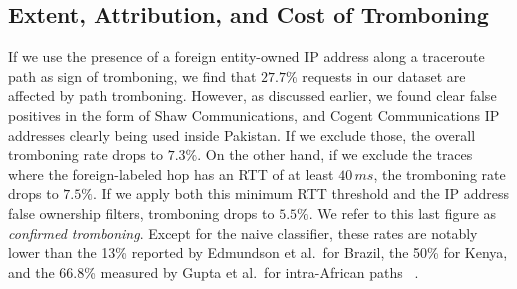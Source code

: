 \documentclass[sigconf,anonymous,10pt]{acmart}
\begin{document}



\subsection{Extent, Attribution, and Cost of Tromboning}
\label{sec:rq3}
If we use the presence of a foreign entity-owned IP address along a traceroute path as sign of tromboning, we find that $27.7\%$ requests in our dataset are affected by path tromboning. However, as discussed earlier, we found clear false positives in the form of Shaw Communications, and Cogent Communications IP addresses clearly being used inside Pakistan. If we exclude those, the overall tromboning rate drops to $7.3\%$. On the other hand, if we exclude the traces where the foreign-labeled hop has an RTT of at least $40\,ms$, the tromboning rate drops to $7.5\%$. If we apply both this minimum RTT threshold and the IP address false ownership filters, tromboning drops to $5.5\%$. We refer to this last figure as \textit{confirmed tromboning}. %
Except for the naive classifier, these rates are notably lower than the 13\% reported by Edmundson et al.\ for Brazil, the 50\% for Kenya, and the 66.8\% measured by Gupta et al.\ for intra-African paths ~\cite{edmundson2016characterizing, gupta2014}. 
\end{document}
